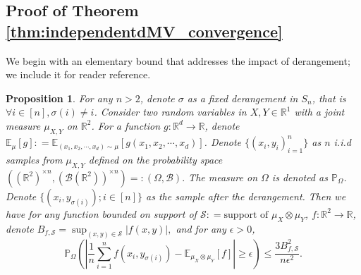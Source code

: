 \documentclass[12pt]{article}
\newcommand{\RR}{\mathbb{R}}
\newcommand{\EE}{\mathbb{E}}
\newcommand{\PP}{\mathbb{P}}
\newtheorem{proposition}{Proposition}
\theoremstyle{definition}
\begin{document}

\subsection{Proof of Theorem \ref{thm:independentdMV_convergence}}
We begin with an elementary bound that addresses the impact of derangement; we include it for reader reference.

\begin{proposition}\label{prop:derangement-2d}
For any $n>2$, denote $\sigma$ as a fixed derangement in $S_n$, that is $\forall i \in [n], \sigma(i) \neq i$. Consider two random variables in $X,Y\in\RR^1$ with a joint measure $\mu_{X,Y}$ on $\RR^2$. For a function $g: \RR^d \to \RR$, denote $\EE_{\mu}[g] : =\EE_{(x_1,x_2,\cdots,x_d) \sim \mu}[g(x_1,x_2,\cdots,x_d)]$.
Denote $\{(x_i,y_i)^n_{i=1}\}$ as $n$ i.i.d samples from $\mu_{X,Y}$ defined on the probability space $((\RR^2)^{\times n}, (\mathcal{B}(\RR^2))^{\times n}) = : (\Omega, \mathcal{B} ).$ The measure on $\Omega$ is denoted as $\PP_{\Omega}$. Denote $
\{ \left(x_i, y _{\sigma(i)} \right); i \in [n]\}$ as the sample after the derangement. Then we have for any function bounded on support of $\mathcal{S}: = \text{support of } \mu_X \otimes \mu_Y $, $f: \RR^2 \to \RR$, denote 
$
B_{f,\mathcal{S}} = \sup_{(x,y) \in \mathcal{S}} |f(x,y)|,
$
and for any $\epsilon > 0$, 
$$
\PP_{\Omega} \left( \left| \frac{1}{n} \sum^n_{i=1} f\left(x_i, y_{\sigma(i)}\right)  -  \EE_{ \mu_X \otimes \mu_Y}[f]   \right| \ge \epsilon \right) \le \frac{ 3 B_{f,\mathcal{S}}^2 }{n \epsilon ^2}.
$$
\end{proposition}

\end{document}
